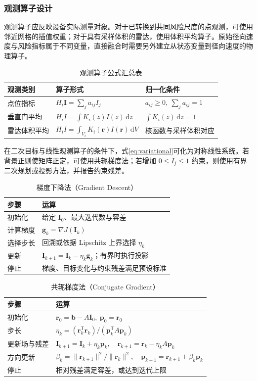 \subsubsection{观测算子设计}
观测算子应反映设备实际测量对象。对于已转换到共同风险尺度的点观测，可使用邻近网格的插值权重；对于具有采样体积的雷达，使用体积平均算子。原始径向速度与风险指标属于不同变量，直接融合时需要另外建立从状态变量到径向速度的物理算子。
\begin{table}[H]\centering\caption{观测算子公式汇总表}
\begin{tabularx}{\linewidth}{lYY}\toprule
观测类别 & 算子形式 & 归一化条件\\\midrule
点位指标 & $H_i\bm I=\sum_j a_{ij}I_j$ & $a_{ij}\ge0,\ \sum_j a_{ij}=1$\\
垂直门平均 & $H_iI=\int K_i(z)I(z)\,\mathrm dz$ & $\int K_i(z)\,\mathrm dz=1$\\
雷达体积平均 & $H_iI=\int_{V_i}K_i(\bm r)I(\bm r)\,\mathrm dV$ & 核函数与采样体积对应\\\bottomrule
\end{tabularx}\end{table}
在二次目标与线性观测算子的条件下，式\eqref{eq:variational}可化为对称线性系统。若背景正则使矩阵正定，可使用共轭梯度法；若增加 $0\le I_j\le1$ 约束，则使用有界二次规划或投影方法，并报告约束残差。
\begin{table}[H]\centering\caption{梯度下降法（Gradient Descent）}
\begin{tabularx}{\linewidth}{lY}\toprule
步骤 & 运算\\\midrule
初始化 & 给定 $\bm I_0$、最大迭代数与容差\\
计算梯度 & $\bm g_k=\nabla J(\bm I_k)$\\
选择步长 & 回溯或依据 Lipschitz 上界选择 $\eta_k$\\
更新 & $\bm I_{k+1}=\bm I_k-\eta_k\bm g_k$；有界时执行投影\\
停止 & 梯度、目标变化与约束残差满足预设标准\\\bottomrule
\end{tabularx}\end{table}
\begin{table}[H]\centering\caption{共轭梯度法（Conjugate Gradient）}
\begin{tabularx}{\linewidth}{lY}\toprule
步骤 & 运算\\\midrule
初始化 & $\bm r_0=\bm b-A\bm I_0,\ \bm p_0=\bm r_0$\\
步长 & $\eta_k=(\bm r_k^\mathsf T\bm r_k)/(\bm p_k^\mathsf TA\bm p_k)$\\
更新场与残差 & $\bm I_{k+1}=\bm I_k+\eta_k\bm p_k,\quad\bm r_{k+1}=\bm r_k-\eta_k A\bm p_k$\\
方向更新 & $\beta_k=\|\bm r_{k+1}\|^2/\|\bm r_k\|^2,\quad\bm p_{k+1}=\bm r_{k+1}+\beta_k\bm p_k$\\
停止 & 相对残差满足容差，或达到迭代上限\\\bottomrule
\end{tabularx}\end{table}
